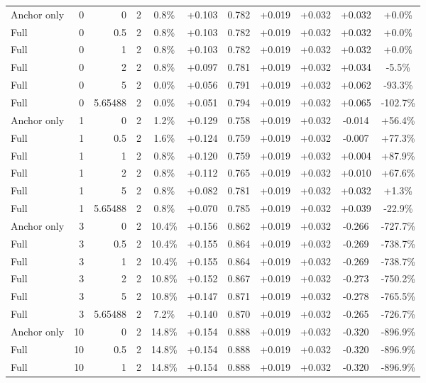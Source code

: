\begin{table}[htbp]
\begin{tabular}{lrrrccccccc}
Anchor only & 0 & 0 & 2 & 0.8\% & +0.103 & 0.782 & +0.019 & +0.032 & +0.032 & +0.0\% \\
Full & 0 & 0.5 & 2 & 0.8\% & +0.103 & 0.782 & +0.019 & +0.032 & +0.032 & +0.0\% \\
Full & 0 & 1 & 2 & 0.8\% & +0.103 & 0.782 & +0.019 & +0.032 & +0.032 & +0.0\% \\
Full & 0 & 2 & 2 & 0.8\% & +0.097 & 0.781 & +0.019 & +0.032 & +0.034 & -5.5\% \\
Full & 0 & 5 & 2 & 0.0\% & +0.056 & 0.791 & +0.019 & +0.032 & +0.062 & -93.3\% \\
Full & 0 & 5.65488 & 2 & 0.0\% & +0.051 & 0.794 & +0.019 & +0.032 & +0.065 & -102.7\% \\
Anchor only & 1 & 0 & 2 & 1.2\% & +0.129 & 0.758 & +0.019 & +0.032 & -0.014 & +56.4\% \\
Full & 1 & 0.5 & 2 & 1.6\% & +0.124 & 0.759 & +0.019 & +0.032 & -0.007 & +77.3\% \\
Full & 1 & 1 & 2 & 0.8\% & +0.120 & 0.759 & +0.019 & +0.032 & +0.004 & +87.9\% \\
Full & 1 & 2 & 2 & 0.8\% & +0.112 & 0.765 & +0.019 & +0.032 & +0.010 & +67.6\% \\
Full & 1 & 5 & 2 & 0.8\% & +0.082 & 0.781 & +0.019 & +0.032 & +0.032 & +1.3\% \\
Full & 1 & 5.65488 & 2 & 0.8\% & +0.070 & 0.785 & +0.019 & +0.032 & +0.039 & -22.9\% \\
Anchor only & 3 & 0 & 2 & 10.4\% & +0.156 & 0.862 & +0.019 & +0.032 & -0.266 & -727.7\% \\
Full & 3 & 0.5 & 2 & 10.4\% & +0.155 & 0.864 & +0.019 & +0.032 & -0.269 & -738.7\% \\
Full & 3 & 1 & 2 & 10.4\% & +0.155 & 0.864 & +0.019 & +0.032 & -0.269 & -738.7\% \\
Full & 3 & 2 & 2 & 10.8\% & +0.152 & 0.867 & +0.019 & +0.032 & -0.273 & -750.2\% \\
Full & 3 & 5 & 2 & 10.8\% & +0.147 & 0.871 & +0.019 & +0.032 & -0.278 & -765.5\% \\
Full & 3 & 5.65488 & 2 & 7.2\% & +0.140 & 0.870 & +0.019 & +0.032 & -0.265 & -726.7\% \\
Anchor only & 10 & 0 & 2 & 14.8\% & +0.154 & 0.888 & +0.019 & +0.032 & -0.320 & -896.9\% \\
Full & 10 & 0.5 & 2 & 14.8\% & +0.154 & 0.888 & +0.019 & +0.032 & -0.320 & -896.9\% \\
Full & 10 & 1 & 2 & 14.8\% & +0.154 & 0.888 & +0.019 & +0.032 & -0.320 & -896.9\% \\

\end{tabular}
\end{table}

